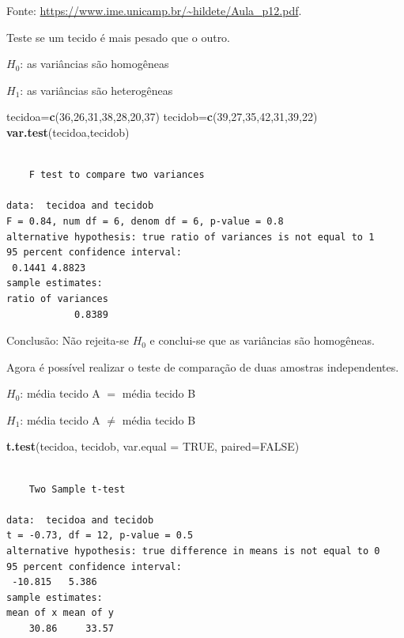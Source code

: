 \documentclass[12pt,brazil,oneside]{book}
\newenvironment{Shaded}{\begin{snugshade}}{\end{snugshade}}
\newcommand{\DataTypeTok}[1]{\textcolor[rgb]{0.13,0.29,0.53}{#1}}
\newcommand{\DecValTok}[1]{\textcolor[rgb]{0.00,0.00,0.81}{#1}}
\newcommand{\KeywordTok}[1]{\textcolor[rgb]{0.13,0.29,0.53}{\textbf{#1}}}
\newcommand{\NormalTok}[1]{#1}
\newcommand{\OtherTok}[1]{\textcolor[rgb]{0.56,0.35,0.01}{#1}}
\begin{document}
Fonte: \url{https://www.ime.unicamp.br/~hildete/Aula_p12.pdf}.

Teste se um tecido é mais pesado que o outro.

\textbf{\(H_0\)}: as variâncias são homogêneas

\textbf{\(H_1\)}: as variâncias são heterogêneas

\begin{Shaded}
\begin{Highlighting}[]
\NormalTok{tecidoa=}\KeywordTok{c}\NormalTok{(}\DecValTok{36}\NormalTok{,}\DecValTok{26}\NormalTok{,}\DecValTok{31}\NormalTok{,}\DecValTok{38}\NormalTok{,}\DecValTok{28}\NormalTok{,}\DecValTok{20}\NormalTok{,}\DecValTok{37}\NormalTok{)}
\NormalTok{tecidob=}\KeywordTok{c}\NormalTok{(}\DecValTok{39}\NormalTok{,}\DecValTok{27}\NormalTok{,}\DecValTok{35}\NormalTok{,}\DecValTok{42}\NormalTok{,}\DecValTok{31}\NormalTok{,}\DecValTok{39}\NormalTok{,}\DecValTok{22}\NormalTok{)}
\KeywordTok{var.test}\NormalTok{(tecidoa,tecidob)}
\end{Highlighting}
\end{Shaded}

\begin{verbatim}

    F test to compare two variances

data:  tecidoa and tecidob
F = 0.84, num df = 6, denom df = 6, p-value = 0.8
alternative hypothesis: true ratio of variances is not equal to 1
95 percent confidence interval:
 0.1441 4.8823
sample estimates:
ratio of variances 
            0.8389 
\end{verbatim}

Conclusão: Não rejeita-se \(H_0\) e conclui-se que as variâncias são homogêneas.

Agora é possível realizar o teste de comparação de duas amostras independentes.

\textbf{\(H_0\)}: média tecido A \(=\) média tecido B

\textbf{\(H_1\)}: média tecido A \(\neq\) média tecido B

\begin{Shaded}
\begin{Highlighting}[]
\KeywordTok{t.test}\NormalTok{(tecidoa, tecidob, }\DataTypeTok{var.equal =} \OtherTok{TRUE}\NormalTok{, }\DataTypeTok{paired=}\OtherTok{FALSE}\NormalTok{)}
\end{Highlighting}
\end{Shaded}

\begin{verbatim}

    Two Sample t-test

data:  tecidoa and tecidob
t = -0.73, df = 12, p-value = 0.5
alternative hypothesis: true difference in means is not equal to 0
95 percent confidence interval:
 -10.815   5.386
sample estimates:
mean of x mean of y 
    30.86     33.57 
\end{verbatim}
\end{document}

